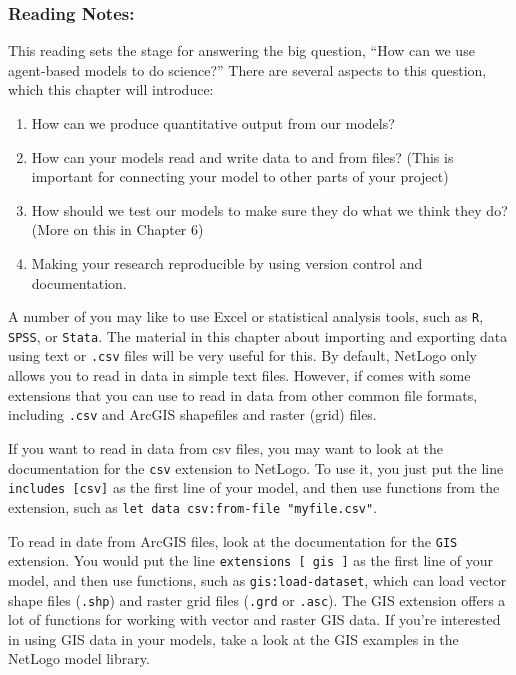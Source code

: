 \documentclass[
]{article}
\providecommand{\tightlist}{%
  \setlength{\itemsep}{0pt}\setlength{\parskip}{0pt}}
\begin{document}
\subsubsection{Reading Notes:}\label{reading-notes-4}

This reading sets the stage for answering the big question, ``How can we
use agent-based models to do science?'' There are several aspects to
this question, which this chapter will introduce:

\begin{enumerate}
\def\labelenumi{\arabic{enumi}.}
\tightlist
\item
  How can we produce quantitative output from our models?
\item
  How can your models read and write data to and from files? (This is
  important for connecting your model to other parts of your project)
\item
  How should we test our models to make sure they do what we think they
  do? (More on this in Chapter 6)
\item
  Making your research reproducible by using version control and
  documentation.
\end{enumerate}

A number of you may like to use Excel or statistical analysis tools,
such as \texttt{R}, \texttt{SPSS}, or \texttt{Stata}. The material in
this chapter about importing and exporting data using text or
\texttt{.csv} files will be very useful for this. By default, NetLogo
only allows you to read in data in simple text files. However, if comes
with some extensions that you can use to read in data from other common
file formats, including \texttt{.csv} and ArcGIS shapefiles and raster
(grid) files.

If you want to read in data from csv files, you may want to look at the
documentation for the \texttt{csv} extension to NetLogo. To use it, you
just put the line \texttt{includes\ {[}csv{]}} as the first line of your
model, and then use functions from the extension, such as
\texttt{let\ data\ csv:from-file\ "myfile.csv"}.

To read in date from ArcGIS files, look at the documentation for the
\texttt{GIS} extension. You would put the line
\texttt{extensions\ {[}\ gis\ {]}} as the first line of your model, and
then use functions, such as \texttt{gis:load-dataset}, which can load
vector shape files (\texttt{.shp}) and raster grid files (\texttt{.grd}
or \texttt{.asc}). The GIS extension offers a lot of functions for
working with vector and raster GIS data. If you're interested in using
GIS data in your models, take a look at the GIS examples in the NetLogo
model library.
\end{document}
